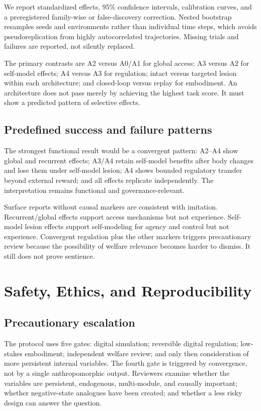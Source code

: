 \documentclass[conference]{IEEEtran}
\begin{document}
We report standardized effects, 95\% confidence intervals, calibration curves, and a preregistered family-wise or false-discovery correction. Nested bootstrap resamples seeds and environments rather than individual time steps, which avoids pseudoreplication from highly autocorrelated trajectories. Missing trials and failures are reported, not silently replaced.

The primary contrasts are A2 versus A0/A1 for global access; A3 versus A2 for self-model effects; A4 versus A3 for regulation; intact versus targeted lesion within each architecture; and closed-loop versus replay for embodiment. An architecture does not pass merely by achieving the highest task score. It must show a predicted pattern of selective effects.

\subsection{Predefined success and failure patterns}

The strongest functional result would be a convergent pattern: A2--A4 show global and recurrent effects; A3/A4 retain self-model benefits after body changes and lose them under self-model lesion; A4 shows bounded regulatory transfer beyond external reward; and all effects replicate independently. The interpretation remains functional and governance-relevant.

Surface reports without causal markers are consistent with imitation. Recurrent/global effects support access mechanisms but not experience. Self-model lesion effects support self-modeling for agency and control but not experience. Convergent regulation plus the other markers triggers precautionary review because the possibility of welfare relevance becomes harder to dismiss. It still does not prove sentience.

\section{Safety, Ethics, and Reproducibility}

\subsection{Precautionary escalation}

The protocol uses five gates: digital simulation; reversible digital regulation; low-stakes embodiment; independent welfare review; and only then consideration of more persistent internal variables. The fourth gate is triggered by convergence, not by a single anthropomorphic output. Reviewers examine whether the variables are persistent, endogenous, multi-module, and causally important; whether negative-state analogues have been created; and whether a less risky design can answer the question.
\end{document}
